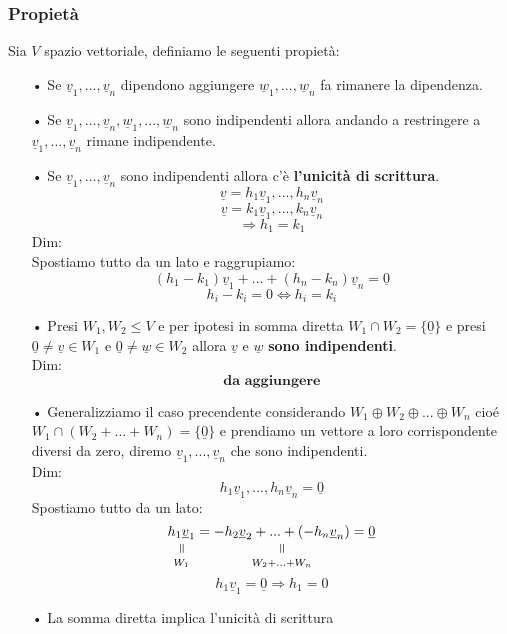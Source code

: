 \subsubsection{Propietà}
Sia $V$ spazio vettoriale, definiamo le seguenti propietà:
\begin{itemize}
\item[•] Se $\underline{v}_1,...,\underline{v}_n$ dipendono aggiungere $\underline{w}_1,...,\underline{w}_n$ fa rimanere la dipendenza.

\item[•] Se $\underline{v}_1,...,\underline{v}_n, \underline{w}_1,...,\underline{w}_n$ sono indipendenti allora andando a restringere a $\underline{v}_1,...,\underline{v}_n$ rimane indipendente.

\item[•] Se $\underline{v}_1,...,\underline{v}_n$ sono indipendenti allora c'è \textbf{l'unicità di scrittura}.
$$ \underline{v} = h_1\underline{v}_1,...,h_n\underline{v}_n $$
$$ \underline{v} = k_1\underline{v}_1,...,k_n\underline{v}_n $$
$$ \Rightarrow h_1 = k_1 $$
Dim:\\
Spostiamo tutto da un lato e raggrupiamo:
$$ (h_1-k_1)\underline{v}_1+...+(h_n-k_n)\underline{v}_n = \underline{0} $$
$$ h_i-k_i = 0 \Leftrightarrow h_i = k_i $$

\item[•] Presi $W_1,W_2 \le V$ e per ipotesi in somma diretta $W_1 \cap W_2 = \{\underline{0}\}$ e presi $\underline{0} \neq \underline{v} \in W_1$ e $\underline{0} \neq \underline{w} \in W_2$ allora $\underline{v}$ e $\underline{w}$ \textbf{sono indipendenti}.\\
Dim:
$$ \textbf{da aggiungere} $$

\item[•] Generalizziamo il caso precendente considerando $W_1 \oplus W_2 \oplus ... \oplus W_n$ cioé $W_1 \cap (W_2+...+W_n) = \{\underline{0}\} $ e prendiamo un vettore a loro corrispondente diversi da zero, diremo $\underline{v}_1,...,\underline{v}_n$ che sono indipendenti.\\
Dim:
$$ h_1\underline{v}_1,...,h_n\underline{v}_n = \underline{0} $$
Spostiamo tutto da un lato:
$$ \equalto{h_1\underline{v}_1}{W_1} = \equalto{-h_2\underline{v}_2 +...+ (-h_n\underline{v}_n)}{W_2+...+W_n} = \underline{0} $$
$$ h_1\underline{v}_1 = \underline{0} \Rightarrow h_1 = 0 $$ 

\item[•] La somma diretta implica l'unicità di scrittura


\end{itemize}









